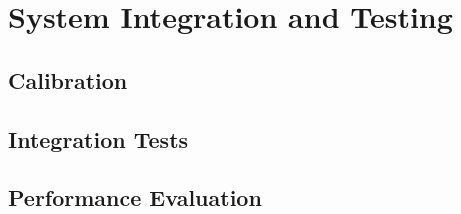 \chapter{System Integration and Testing}
\label{chap:testing}

\setcounter{section}{0}
\setcounter{subsection}{0}

\section{Calibration}
\label{sec:calibration}

\FloatBarrier  %

\section{Integration Tests}
\label{sec:integration}

\FloatBarrier  %

\section{Performance Evaluation}
\label{sec:performance}

\FloatBarrier  %



